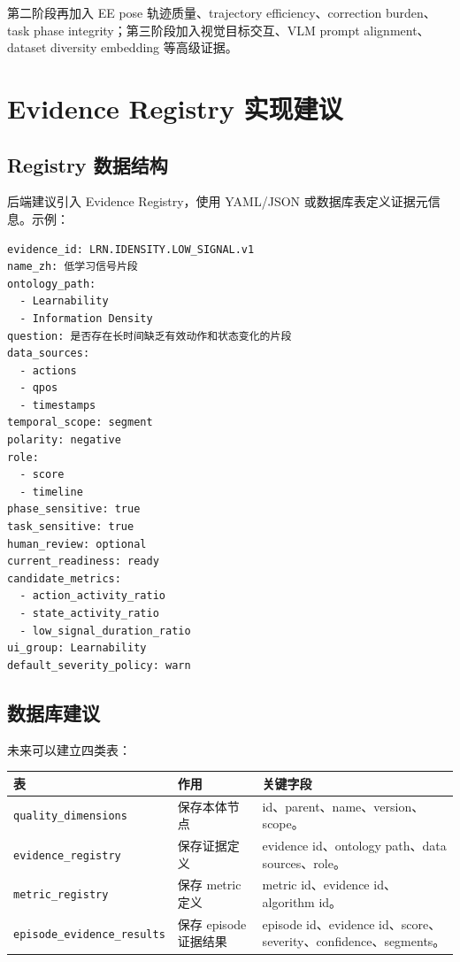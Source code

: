 \documentclass[UTF8,zihao=-4,oneside,openany]{ctexrep}
\newcommand{\Code}[1]{\texttt{#1}}
\begin{document}
第二阶段再加入 EE pose 轨迹质量、trajectory efficiency、correction burden、task phase integrity；第三阶段加入视觉目标交互、VLM prompt alignment、dataset diversity embedding 等高级证据。

\section{Evidence Registry 实现建议}

\subsection{Registry 数据结构}

后端建议引入 Evidence Registry，使用 YAML/JSON 或数据库表定义证据元信息。示例：

\begin{verbatim}
evidence_id: LRN.IDENSITY.LOW_SIGNAL.v1
name_zh: 低学习信号片段
ontology_path:
  - Learnability
  - Information Density
question: 是否存在长时间缺乏有效动作和状态变化的片段
data_sources:
  - actions
  - qpos
  - timestamps
temporal_scope: segment
polarity: negative
role:
  - score
  - timeline
phase_sensitive: true
task_sensitive: true
human_review: optional
current_readiness: ready
candidate_metrics:
  - action_activity_ratio
  - state_activity_ratio
  - low_signal_duration_ratio
ui_group: Learnability
default_severity_policy: warn
\end{verbatim}

\subsection{数据库建议}

未来可以建立四类表：

\begin{longtable}{L{3.5cm} L{4.5cm} L{5.6cm}}
\toprule
表 & 作用 & 关键字段 \\
\midrule
\Code{quality\_dimensions} & 保存本体节点 & id、parent、name、version、scope。 \\
\Code{evidence\_registry} & 保存证据定义 & evidence id、ontology path、data sources、role。 \\
\Code{metric\_registry} & 保存 metric 定义 & metric id、evidence id、algorithm id。 \\
\Code{episode\_evidence\_results} & 保存 episode 证据结果 & episode id、evidence id、score、severity、confidence、segments。 \\
\bottomrule
\end{longtable}
\end{document}
